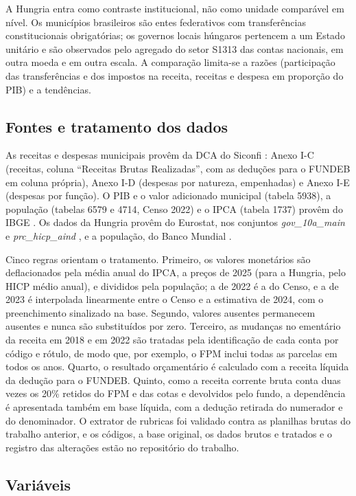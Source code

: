 A Hungria entra como contraste institucional, não como unidade comparável em nível. Os municípios brasileiros são entes federativos com transferências constitucionais obrigatórias; os governos locais húngaros pertencem a um Estado unitário e são observados pelo agregado do setor S1313 das contas nacionais, em outra moeda e em outra escala. A comparação limita-se a razões (participação das transferências e dos impostos na receita, receitas e despesa em proporção do PIB) e a tendências.

\subsection{Fontes e tratamento dos dados}

As receitas e despesas municipais provêm da DCA do Siconfi \citep{Siconfi}: Anexo I-C (receitas, coluna ``Receitas Brutas Realizadas'', com as deduções para o FUNDEB em coluna própria), Anexo I-D (despesas por natureza, empenhadas) e Anexo I-E (despesas por função). O PIB e o valor adicionado municipal (tabela 5938), a população (tabelas 6579 e 4714, Censo 2022) e o IPCA (tabela 1737) provêm do IBGE \citep{IBGESidra}. Os dados da Hungria provêm do Eurostat, nos conjuntos \textit{gov\_10a\_main} e \textit{prc\_hicp\_aind} \citep{Eurostat}, e a população, do Banco Mundial \citep{WDI}.

Cinco regras orientam o tratamento. Primeiro, os valores monetários são deflacionados pela média anual do IPCA, a preços de 2025 (para a Hungria, pelo HICP médio anual), e divididos pela população; a de 2022 é a do Censo, e a de 2023 é interpolada linearmente entre o Censo e a estimativa de 2024, com o preenchimento sinalizado na base. Segundo, valores ausentes permanecem ausentes e nunca são substituídos por zero. Terceiro, as mudanças no ementário da receita em 2018 e em 2022 são tratadas pela identificação de cada conta por código e rótulo, de modo que, por exemplo, o FPM inclui todas as parcelas em todos os anos. Quarto, o resultado orçamentário é calculado com a receita líquida da dedução para o FUNDEB. Quinto, como a receita corrente bruta conta duas vezes os 20\% retidos do FPM e das cotas e devolvidos pelo fundo, a dependência é apresentada também em base líquida, com a dedução retirada do numerador e do denominador. O extrator de rubricas foi validado contra as planilhas brutas do trabalho anterior, e os códigos, a base original, os dados brutos e tratados e o registro das alterações estão no repositório do trabalho.

\subsection{Variáveis}

